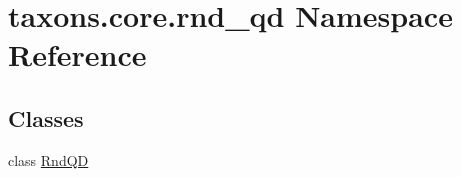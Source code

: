 \hypertarget{namespacetaxons_1_1core_1_1rnd__qd}{}\section{taxons.\+core.\+rnd\+\_\+qd Namespace Reference}
\label{namespacetaxons_1_1core_1_1rnd__qd}
\subsection*{Classes}
\begin{DoxyCompactItemize}
\item 
class \hyperlink{classtaxons_1_1core_1_1rnd__qd_1_1_rnd_q_d}{Rnd\+QD}
\end{DoxyCompactItemize}
